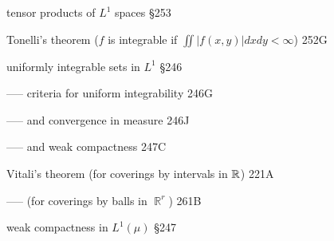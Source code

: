 tensor products of $L^1$ spaces \S253








Tonelli's theorem
($f$ is integrable if $\iint|f(x,y)|dxdy<\infty$) 252G





















\indexmedskip














uniformly integrable sets in $L^1$ \S246

----- criteria for uniform integrability 246G



----- and convergence in measure 246J

----- and weak compactness 247C









\indexmedskip




Vitali's theorem (for coverings by intervals in $\Bbb R$) 221A

----- (for coverings by balls in $\BbbR^r$) 261B





\indexmedskip

weak compactness in $L^1(\mu)$ \S247





















